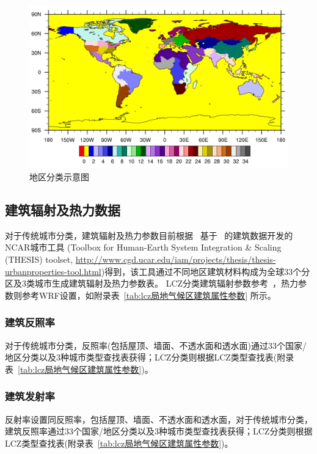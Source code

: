 {
\begin{figure}[htbp]
\centering
\includegraphics[width=.7\paperwidth]{Figures/基础数据/地区分类.jpg}
\caption{地区分类示意图}
\label{fig:地区分类}
\end{figure}
}

\subsection{建筑辐射及热力数据}\label{建筑辐射及热力数据}
对于传统城市分类，建筑辐射及热力参数目前根据~\citet{oleson2020parameterization} 基于~\citet{jackson2010parameterization} 的建筑数据开发的NCAR城市工具
(Toolbox for Human-Earth System Integration \& Scaling (THESIS) toolset, \url{http://www.cgd.ucar.edu/iam/projects/thesis/thesis-urbanproperties-tool.html})得到，该工具通过不同地区建筑材料构成为全球33个分区及3类城市生成建筑辐射及热力参数表。
LCZ分类建筑辐射参数参考~\citet{stewart2014evaluation}，热力参数则参考WRF设置，如附录表~\ref{tab:lcz局地气候区建筑属性参数} 所示。

\subsubsection{建筑反照率}\label{建筑反照率}
对于传统城市分类，反照率(包括屋顶、墙面、不透水面和透水面)通过33个国家/地区分类以及3种城市类型查找表获得；LCZ分类则根据LCZ类型查找表(附录表~\ref{tab:lcz局地气候区建筑属性参数})。

\subsubsection{建筑发射率}\label{建筑发射率}
反射率设置同反照率，包括屋顶、墙面、不透水面和透水面，对于传统城市分类，建筑反照率通过33个国家/地区分类以及3种城市类型查找表获得；LCZ分类则根据LCZ类型查找表(附录表~\ref{tab:lcz局地气候区建筑属性参数})。

